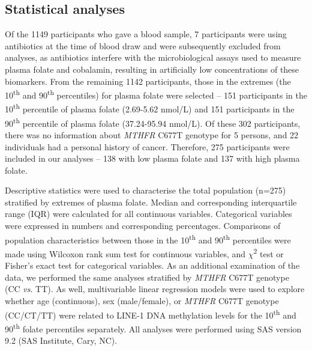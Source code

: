 \subsection{Statistical analyses} %
\noindent Of the 1149 participants who gave a blood sample, 7 participants were using antibiotics at the time of blood draw and were subsequently excluded from analyses, as antibiotics interfere with the microbiological assays used to measure plasma folate and cobalamin, resulting in artificially low concentrations of these biomarkers. From the remaining 1142 participants, those in the extremes (the 10\textsuperscript{th} and 90\textsuperscript{th} percentiles) for plasma folate were selected -- 151 participants in the 10\textsuperscript{th} percentile of plasma folate (2.69-5.62 nmol/L) and 151 participants in the 90\textsuperscript{th} percentile of plasma folate (37.24-95.94 nmol/L). Of these 302 participants, there was no information about \emph{MTHFR} C677T genotype for 5 persons, and 22 individuals had a personal history of cancer. Therefore, 275 participants were included in our analyses -- 138 with low plasma folate and 137 with high plasma folate.

\noindent Descriptive statistics were used to characterise the total population (n=275) stratified by extremes of plasma folate. Median and corresponding interquartile range (IQR) were calculated for all continuous variables. Categorical variables were expressed in numbers and corresponding percentages. Comparisons of population characteristics between those in the 10\textsuperscript{th} and 90\textsuperscript{th} percentiles were made using Wilcoxon rank sum test for continuous variables, and $\chi$\textsuperscript{2} test or Fisher's exact test for categorical variables. As an additional examination of the data, we performed the same analyses stratified by \emph{MTHFR} C677T genotype (CC \emph{vs}. TT). As well, multivariable linear regression models were used to explore whether age (continuous), sex (male/female), or \emph{MTHFR} C677T genotype (CC/CT/TT) were related to LINE-1 DNA methylation levels for the 10\textsuperscript{th} and 90\textsuperscript{th} folate percentiles separately. All analyses were performed using SAS version 9.2 (SAS Institute, Cary, NC).

